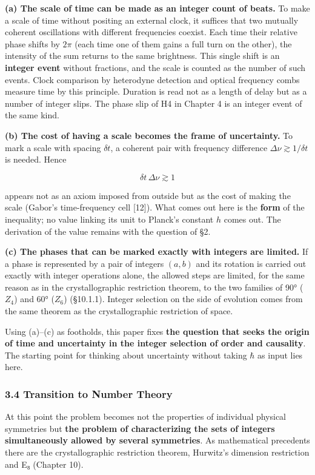 \documentclass[
  a4paper,
]{article}
\begin{document}
\textbf{(a) The scale of time can be made as an integer count of beats.}
To make a scale of time without positing an external clock, it suffices
that two mutually coherent oscillations with different frequencies
coexist. Each time their relative phase shifts by \(2\pi\) (each time
one of them gains a full turn on the other), the intensity of the sum
returns to the same brightness. This single shift is an \textbf{integer
event} without fractions, and the scale is counted as the number of such
events. Clock comparison by heterodyne detection and optical frequency
combs measure time by this principle. Duration is read not as a length
of delay but as a number of integer slips. The phase slip of H4 in
Chapter 4 is an integer event of the same kind.

\textbf{(b) The cost of having a scale becomes the frame of
uncertainty.} To mark a scale with spacing \(\delta t\), a coherent pair
with frequency difference \(\Delta\nu\gtrsim1/\delta t\) is needed.
Hence

\[
\delta t\,\Delta\nu\gtrsim1
\]

appears not as an axiom imposed from outside but as the cost of making
the scale (Gabor's time-frequency cell {[}12{]}). What comes out here is
the \textbf{form} of the inequality; no value linking its unit to
Planck's constant \(h\) comes out. The derivation of the value remains
with the question of §2.

\textbf{(c) The phases that can be marked exactly with integers are
limited.} If a phase is represented by a pair of integers \((a,b)\) and
its rotation is carried out exactly with integer operations alone, the
allowed steps are limited, for the same reason as in the
crystallographic restriction theorem, to the two families of 90°
(\(Z_4\)) and 60° (\(Z_6\)) (§10.1.1). Integer selection on the side of
evolution comes from the same theorem as the crystallographic
restriction of space.

Using (a)--(c) as footholds, this paper fixes \textbf{the question that
seeks the origin of time and uncertainty in the integer selection of
order and causality}. The starting point for thinking about uncertainty
without taking \(\hbar\) as input lies here.

\subsubsection{3.4 Transition to Number
Theory}\label{transition-to-number-theory}

At this point the problem becomes not the properties of individual
physical symmetries but \textbf{the problem of characterizing the sets
of integers simultaneously allowed by several symmetries}. As
mathematical precedents there are the crystallographic restriction
theorem, Hurwitz's dimension restriction and E₈ (Chapter 10).
\end{document}
